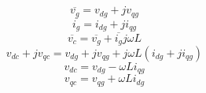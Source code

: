 \begin{equation}
\overline{v_{g}}=v_{dg}+jv_{qg}
\end{equation}
\begin{equation}
\overline{i_{g}}=i_{dg}+ji_{qg}
\end{equation}
\begin{equation}
\overline{v_{c}}=\overline{v_{g}}+\overline{i_{g}}j\omega L
\end{equation}
\begin{equation}
v_{dc}+jv_{qc}=v_{dg}+jv_{qg}+j\omega L (i_{dg}+ji_{qg})
\end{equation}
\begin{equation}
v_{dc}=v_{dg}-\omega L i_{qg}
\label{crosscomp1}
\end{equation}
\begin{equation}
v_{qc}=v_{qg}+\omega L i_{dg}
\label{crosscomp2}
\end{equation}

